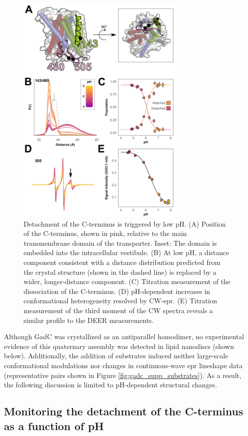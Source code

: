 \begin{figure}
\centering
\includegraphics[width=3.25in]{Figures/gadc_main_tail.pdf}
 \caption[Detachment of the C-terminus is triggered by low pH.]{Detachment of the C-terminus is triggered by low pH. (A) Position of the C-terminus, shown in pink, relative to the main transmembrane domain of the transporter. Inset: The domain is embedded into the intracellular vestibule. (B) At low pH, a distance component consistent with a distance distribution predicted from the crystal structure (shown in the dashed line) is replaced by a wider, longer-distance component. (C) Titration measurement of the dissociation of the C-terminus. (D) pH-dependent increases in conformational heterogeneity resolved by CW-\gls{epr}. (E) Titration measurement of the third moment of the CW spectra reveals a similar profile to the DEER measurements.}
\label{fig:gadc_main_tail}
\end{figure}

Although GadC was crystallized as an antiparallel homodimer, no experimental evidence of this quaternary assembly was detected in lipid nanodiscs (shown below). Additionally, the addition of substrates induced neither large-scale conformational modulations nor changes in continuous-wave \gls{epr} lineshape data (representative pairs shown in Figure \ref{fig:gadc_supp_substrates}). As a result, the following discussion is limited to pH-dependent structural changes.

\subsection{Monitoring the detachment of the C-terminus as a function of pH}


